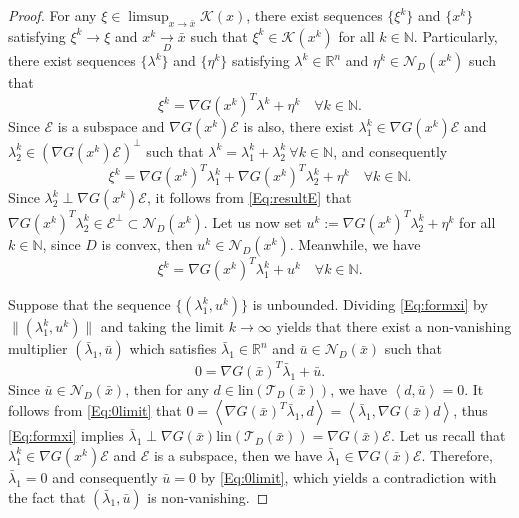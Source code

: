 \documentclass[10pt,a4paper]{amsart}
\begin{document}
\begin{proof}
    For any $\xi\in \limsup_{x \to \bar x} \mathcal K(x)$, there exist sequences $\{\xi^k\}$ and $\{x^k\}$ satisfying $\xi^k \to \xi$ and $x^k \xrightarrow[D]{} \bar x$ such that $\xi^k \in \mathcal K(x^k)$ for all $k\in \mathbb N$. Particularly, there exist sequences $\{\lambda^k\}$ and $\{\eta^k\}$ satisfying $\lambda^k\in \mathbb R^n$ and $\eta^k\in \mathcal N_D(x^k)$ such that
\begin{equation*}
    \xi^k = \nabla G(x^k)^T \lambda ^k +\eta^k \quad \forall k\in \mathbb N.
\end{equation*}
Since $\mathcal E$ is a subspace and $\nabla G(x^k)\mathcal E$ is also, there exist $\lambda_1^k \in \nabla G(x^k)\mathcal E $ and $\lambda_2^k \in \left( \nabla G(x^k)\mathcal E \right)^{\perp}$ such that $\lambda^k=\lambda_1^k +\lambda_2^k \ \forall k\in \mathbb N$,
and consequently
\begin{equation*}
    \xi^k = \nabla G(x^k)^T \lambda_1 ^k + \nabla G(x^k)^T \lambda_2 ^k+ \eta^k \quad \forall k\in \mathbb N.
\end{equation*}
Since $\lambda_2^k \perp \nabla G(x^k)\mathcal E$, it follows from \eqref{Eq:resultE} that $\nabla G(x^k)^T \lambda_2^k \in \mathcal E^{\perp} \subset \mathcal N_D (x^k)$. Let us now set $u^k:=\nabla G(x^k)^T \lambda_2 ^k+ \eta^k$ for all $k\in \mathbb N$, since $D$ is convex, then $u^k\in \mathcal N_D(x^k)$. Meanwhile, we have
\begin{equation}\label{Eq:formxi}
    \xi^k = \nabla G(x^k)^T \lambda_1 ^k + u^k \quad \forall k\in \mathbb N.
\end{equation}

Suppose that the sequence $\{(\lambda_1^k, u^k)\}$ is unbounded. Dividing 
 \eqref{Eq:formxi} by $\|(\lambda_1^k, u^k)\|$ and taking the limit $k\to \infty$ yields that there exist a non-vanishing multiplier $(\bar \lambda_1, \bar u)$ which satisfies $\bar \lambda_1\in \mathbb R^n$ and $\bar u \in \mathcal N_D(\bar x)$ such that 
 \begin{equation}\label{Eq:0limit}
     0 =\nabla G (\bar x)^T \bar \lambda_1 + \bar u.
 \end{equation}
 Since $\bar u \in \mathcal N_D(\bar x)$, then for any $d\in \text{lin}(\mathcal T_D(\bar x))$, we have $\left<d, \bar u \right>=0$. It follows from \eqref{Eq:0limit} that
   $  0=\left<\nabla G (\bar x)^T \bar \lambda_1, d\right> = \left<\bar \lambda_1, \nabla G(\bar x)d \right>$,
 thus \eqref{Eq:formxi} implies $
     \bar \lambda_1 \perp \nabla G(\bar x) \text{lin}(\mathcal T_D(\bar x)) = \nabla G(\bar x) \mathcal E$.
 Let us recall that $\lambda_1^k \in \nabla G(x^k)\mathcal E$ and $\mathcal E$ is a subspace, then we have $\bar \lambda_1 \in \nabla G(\bar x) \mathcal E$. Therefore, $\bar \lambda_1 =0 $ and consequently $\bar u=0$ by \eqref{Eq:0limit}, which yields a contradiction with the fact that $(\bar \lambda_1, \bar u)$ is non-vanishing.


\end{proof}
\end{document}
